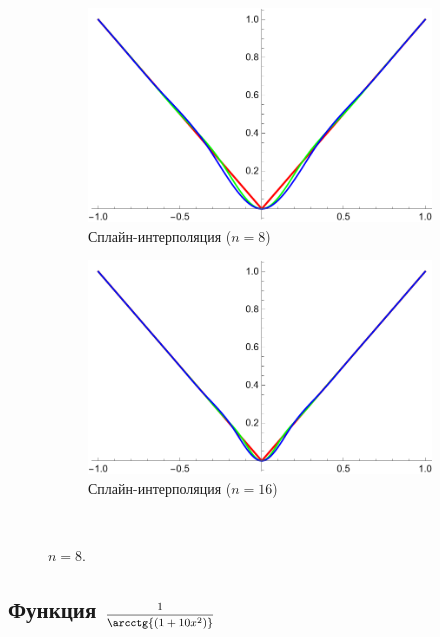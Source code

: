 \documentclass[12pt, a4paper]{article}
\begin{document}
	\begin{figure}[H]
		\centering
		\begin{subfigure}{0.4\textwidth}
			\includegraphics[width=\textwidth]{7_s8}
			\caption{Сплайн-интерполяция ($n=8$)}
		\end{subfigure}
		\hfill
		\begin{subfigure}{0.4\textwidth}
			\includegraphics[width=\textwidth]{7_s16}
			\caption{Сплайн-интерполяция ($n=16$)}
		\end{subfigure}
		\hfill
		\\[0.5cm]
		\caption{$n = 8$.}
	\end{figure}
	
	
	
	\newpage
	\subsection{Функция $\sfrac{1}{\arcctg{(1+10 x^2)}}$}
	
\end{document}
